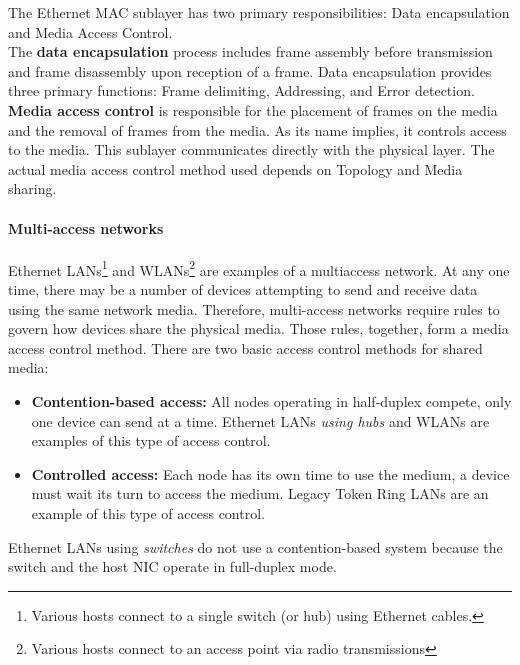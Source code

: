 {The Ethernet MAC sublayer has two primary responsibilities: Data encapsulation and Media Access Control. \\

The \textbf{data encapsulation} process includes frame assembly before transmission and frame disassembly upon reception of a frame. Data encapsulation provides three primary functions: Frame delimiting, Addressing, and Error detection. \\

\textbf{Media access control} is responsible for the placement of frames on the media and the removal of frames from the media. As its name implies, it controls access to the media. This sublayer communicates directly with the physical layer. The actual media access control method used depends on Topology and Media sharing.\\

\paragraph{Multi-access networks} Ethernet LANs\footnote{Various hosts connect to a single switch (or hub) using Ethernet cables.} and WLANs\footnote{Various hosts connect to an access point via radio transmissions} are examples of a multiaccess network. At any one time, there may be a number of devices attempting to send and receive data using the same network media. Therefore, multi-access networks require rules to govern how devices share the physical media. Those rules, together, form a media access control method. There are two basic access control methods for shared media:

\begin{itemize}
\item \textbf{Contention-based access:} All nodes operating in half-duplex compete, only one device can send at a time. Ethernet LANs \emph{using hubs} and WLANs are examples of this type of access control.

\item \textbf{Controlled access:} Each node has its own time to use the medium, a device must wait its turn to access the medium. Legacy Token Ring LANs are an example of this type of access control. 
\end{itemize}

\note Ethernet LANs using \emph{switches} do not use a contention-based system because the switch and the host NIC operate in full-duplex mode.\\

}
